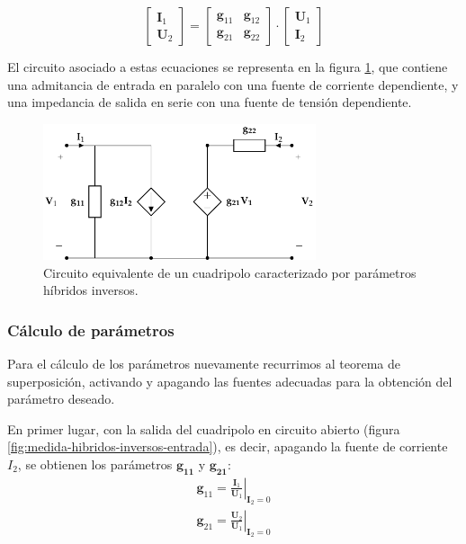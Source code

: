 \begin{equation}
  \label{eq:parametros-hibridos-inversos-matriz}
  \left[
    \begin{array}{c}
      \mathbf{I}_1\\
      \mathbf{U}_2
    \end{array}
  \right] =
  \left[
    \begin{array}{cc}
      \mathbf{g}_{11} & \mathbf{g}_{12}\\
      \mathbf{g}_{21} & \mathbf{g}_{22}
    \end{array}
  \right] \cdot
  \left[
    \begin{array}{c}
      \mathbf{U}_1\\
      \mathbf{I}_2
    \end{array}
  \right]
\end{equation}

El circuito asociado a estas ecuaciones se representa en la figura \ref{fig:circuito-equivalente-hibridos-inversos}, que contiene una admitancia de entrada en paralelo con una fuente de corriente dependiente, y una impedancia de salida en serie con una fuente de tensión dependiente.

\begin{figure}[H]
  \centering
  \includegraphics[height=4cm]{../figs/circuitoEquivalenteG.pdf}
  \caption{Circuito equivalente de un cuadripolo caracterizado por parámetros híbridos inversos.}
  \label{fig:circuito-equivalente-hibridos-inversos}
\end{figure}


\subsubsection{Cálculo de parámetros}

Para el cálculo de los parámetros nuevamente recurrimos al teorema de superposición, activando y apagando las fuentes adecuadas para la obtención del parámetro deseado.

En primer lugar, con la salida del cuadripolo en circuito abierto (figura \ref{fig:medida-hibridos-inversos-entrada}), es decir, apagando la fuente de corriente $I_2$, se obtienen los parámetros $\mathbf{g_{11}}$ y $\mathbf{g_{21}}$:
\[
  \begin{array}{c}
    \mathbf{g}_{11} = \left.\frac{\mathbf{I}_1}{\mathbf{U}_1}\right\rvert_{\mathbf{I}_2 = 0} \\
    \mathbf{g}_{21} = \left.\frac{\mathbf{U}_2}{\mathbf{U}_1}\right\rvert_{\mathbf{I}_2 = 0}
  \end{array}
\]
    
